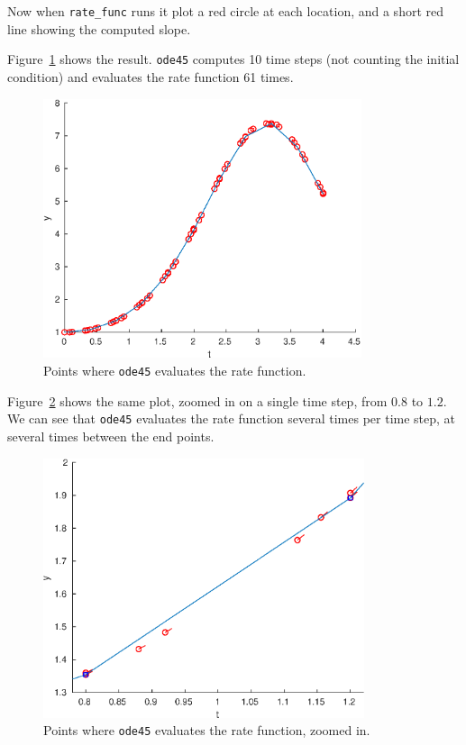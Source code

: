 \documentclass[
]{book}
\numberwithin{Answer}{chapter}
\numberwithin{Exercise}{chapter}
\begin{document}
Now when \verb"rate_func" runs it plot a red circle at each location, and a short red line showing the computed slope.

Figure~\ref{fig:odeplot1} shows the result.  {\tt ode45} computes 10 time steps (not counting the initial condition) and evaluates the rate function 61 times.

\begin{figure}
\centerline{\includegraphics[height=3in]{figs/odeplot1.eps}}
\caption{Points where {\tt ode45} evaluates the rate function.}
\label{fig:odeplot1}
\end{figure}

Figure~\ref{fig:odeplot2} shows the same plot, zoomed in on a single time step, from $0.8$ to $1.2$.  We can see that {\tt ode45} evaluates the rate function several times per time step, at several times between the end points.  

\begin{figure}
\centerline{\includegraphics[height=3in]{figs/odeplot2.eps}}
\caption{Points where {\tt ode45} evaluates the rate function, zoomed in.}
\label{fig:odeplot2}
\end{figure}
\end{document}
